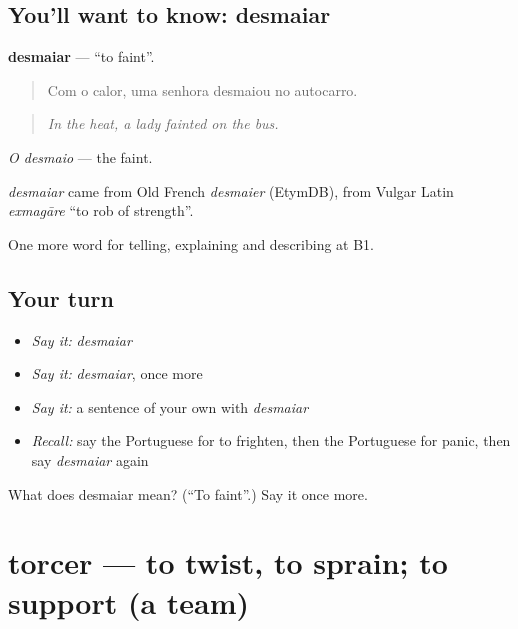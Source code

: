\subsection*{You'll want to know: desmaiar}
\textbf{desmaiar} — \textquotedblleft{}to faint\textquotedblright{}.

\begin{quote}
Com o calor, uma senhora desmaiou no autocarro.
\end{quote}

\begin{quote}
\emph{In the heat, a lady fainted on the bus.}
\end{quote}

\emph{O desmaio} — the faint.

\begin{cousinweb}
\emph{desmaiar} came from Old French \emph{desmaier} (EtymDB), from Vulgar Latin \emph{exmagāre} \textquotedblleft{}to rob of strength\textquotedblright{}.
\end{cousinweb}

\begin{grammarlens}[title={What you've built}]
One more word for telling, explaining and describing at B1.
\end{grammarlens}

\subsection*{Your turn}
\begin{itemize}
\raggedright
  \item \emph{Say it:} \emph{desmaiar}
  \item \emph{Say it:} \emph{desmaiar}, once more
  \item \emph{Say it:} a sentence of your own with \emph{desmaiar}
  \item \emph{Recall:} say the Portuguese for to frighten, then the Portuguese for panic, then say \emph{desmaiar} again
\end{itemize}

\begin{tcolorbox}[breakable,colback=teal!4,colframe=teal!35!black,title={Before you move on}]
What does desmaiar mean? (\textquotedblleft{}To faint\textquotedblright{}.) Say it once more.
\end{tcolorbox}
\section[torcer]{torcer — to twist, to sprain; to support (a team)}

